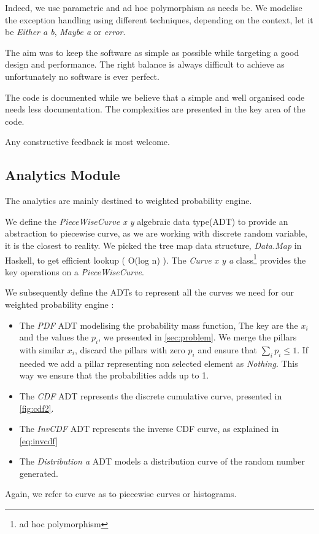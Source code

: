 \documentclass[12pt,a4paper,article]{memoir} %
\begin{document}
Indeed, we use parametric and ad hoc polymorphism as needs be.
We modelise the exception handling using different techniques, depending on
the context, let it be \emph{Either a b}, \emph{Maybe a} or \emph{error}. 

The aim was to keep the software as simple as possible while targeting a
good design and performance. 
The right balance is always difficult to achieve as unfortunately no 
software is ever perfect.

The code is documented while we believe that a simple and well organised
code needs less documentation. The complexities are presented in the key
area of the code. 

Any constructive feedback is most welcome.

\subsection{Analytics Module}

The analytics are mainly destined to weighted probability engine.

We define the \emph{PieceWiseCurve x y} algebraic data type(ADT) to provide an
abstraction to piecewise curve, as we are working with discrete
random variable, it is the closest to reality. We picked the tree map data
structure, \emph{Data.Map} in Haskell, to get efficient lookup ( O(log n) ).
The \emph{Curve x y a} class\footnote{ad hoc polymorphism} 
provides the key operations on a 
\emph{PieceWiseCurve}.  

We subsequently define the ADTs to represent all the curves we need
for our weighted probability engine :
\begin{itemize}
	\item The \emph{PDF} ADT modelising the probability mass function,
	The key are the $x_i$ and the values the $p_i$, we presented in
	\autoref{sec:problem}.
	We merge the pillars with similar $x_i$, discard the pillars with zero
	$p_i$ and ensure that $\sum_i p_i \leq 1$.
	If needed we add a pillar representing non selected element 
	as \emph{Nothing}. This way we ensure that the probabilities
	adds up to 1.
	\item The \emph{CDF} ADT represents the discrete cumulative
	curve, presented in \autoref{fig:cdf2}.
	\item The \emph{InvCDF} ADT represents the inverse CDF curve,
	as explained in \autoref{eq:invcdf}
	\item The \emph{Distribution a} ADT models a distribution curve
	of the random number generated.
\end{itemize}
Again, we refer to curve as to piecewise curves or histograms.
\end{document}
